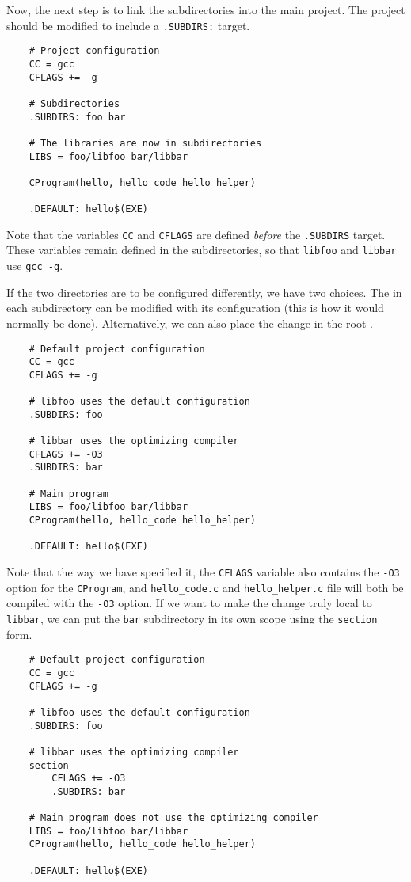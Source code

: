 Now, the next step is to link the subdirectories into the main project.  The project 
should be modified to include a \verb+.SUBDIRS:+ target.

\begin{verbatim}
    # Project configuration
    CC = gcc
    CFLAGS += -g

    # Subdirectories
    .SUBDIRS: foo bar

    # The libraries are now in subdirectories
    LIBS = foo/libfoo bar/libbar

    CProgram(hello, hello_code hello_helper)

    .DEFAULT: hello$(EXE)
\end{verbatim}

Note that the variables \verb+CC+ and \verb+CFLAGS+ are defined \emph{before} the \verb+.SUBDIRS+
target.  These variables remain defined in the subdirectories, so that \verb+libfoo+ and \verb+libbar+
use \verb+gcc -g+.

If the two directories are to be configured differently, we have two choices.  The 
in each subdirectory can be modified with its configuration (this is how it would normally be done).
Alternatively, we can also place the change in the root .

\begin{verbatim}
    # Default project configuration
    CC = gcc
    CFLAGS += -g

    # libfoo uses the default configuration
    .SUBDIRS: foo

    # libbar uses the optimizing compiler
    CFLAGS += -O3
    .SUBDIRS: bar

    # Main program
    LIBS = foo/libfoo bar/libbar
    CProgram(hello, hello_code hello_helper)

    .DEFAULT: hello$(EXE)
\end{verbatim}

Note that the way we have specified it, the \verb+CFLAGS+ variable also contains the \verb+-O3+
option for the \verb+CProgram+, and \verb+hello_code.c+ and \verb+hello_helper.c+ file will both be
compiled with the \verb+-O3+ option.  If we want to make the change truly local to \verb+libbar+, we
can put the \verb+bar+ subdirectory in its own scope using the \verb+section+ form.

\begin{verbatim}
    # Default project configuration
    CC = gcc
    CFLAGS += -g

    # libfoo uses the default configuration
    .SUBDIRS: foo

    # libbar uses the optimizing compiler
    section
        CFLAGS += -O3
        .SUBDIRS: bar

    # Main program does not use the optimizing compiler
    LIBS = foo/libfoo bar/libbar
    CProgram(hello, hello_code hello_helper)

    .DEFAULT: hello$(EXE)
\end{verbatim}

